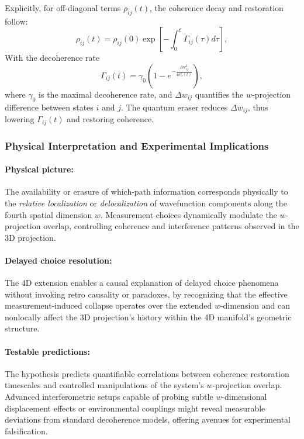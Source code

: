 \documentclass[12pt]{article}
\begin{document}
Explicitly, for off-diagonal terms \(\rho_{ij}(t)\), the coherence decay and restoration follow:
\begin{equation}
\rho_{ij}(t) = \rho_{ij}(0) \exp \left[ - \int_0^t \Gamma_{ij}(\tau) d\tau \right],
\label{eq:coherence_decay}
\end{equation}
With the decoherence rate
\begin{equation}
\Gamma_{ij}(t) = \gamma_0 \left( 1 - e^{-\frac{\Delta w_{ij}^2}{4 \sigma_w^2(t)}} \right),
\label{eq:decoherence_rate}
\end{equation}
where \(\gamma_0\) is the maximal decoherence rate, and \(\Delta w_{ij}\) quantifies the \(w\)-projection difference between states \(i\) and \(j\). The quantum eraser reduces \(\Delta w_{ij}\), thus lowering \(\Gamma_{ij}(t)\) and restoring coherence.

\subsubsection*{Physical Interpretation and Experimental Implications}

\paragraph{Physical picture:} The availability or erasure of which-path information corresponds physically to the \emph{relative localization} or \emph{delocalization} of wavefunction components along the fourth spatial dimension \(w\). Measurement choices dynamically modulate the \(w\)-projection overlap, controlling coherence and interference patterns observed in the 3D projection.

\paragraph{Delayed choice resolution:} The 4D extension enables a causal explanation of delayed choice phenomena without invoking retro causality or paradoxes, by recognizing that the effective measurement-induced collapse operates over the extended \(w\)-dimension and can nonlocally affect the 3D projection's history within the 4D manifold's geometric structure.

\paragraph{Testable predictions:} The hypothesis predicts quantifiable correlations between coherence restoration timescales and controlled manipulations of the system's \(w\)-projection overlap. Advanced interferometric setups capable of probing subtle \(w\)-dimensional displacement effects or environmental couplings might reveal measurable deviations from standard decoherence models, offering avenues for experimental falsification.
\end{document}
